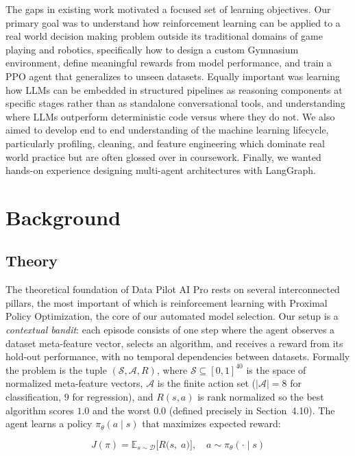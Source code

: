 \documentclass{article}
\begin{document}
The gaps in existing work motivated a focused set of learning objectives. Our primary goal was to understand how reinforcement learning can be applied to a real world decision making problem outside its traditional domains of game playing and robotics, specifically how to design a custom Gymnasium environment, define meaningful rewards from model performance, and train a PPO agent that generalizes to unseen datasets. Equally important was learning how LLMs can be embedded in structured pipelines as reasoning components at specific stages rather than as standalone conversational tools, and understanding where LLMs outperform deterministic code versus where they do not. We also aimed to develop end to end understanding of the machine learning lifecycle, particularly profiling, cleaning, and feature engineering which dominate real world practice but are often glossed over in coursework. Finally, we wanted hands-on experience designing multi-agent architectures with LangGraph.





\section{Background}

\subsection{Theory}

The theoretical foundation of Data Pilot AI Pro rests on several
interconnected pillars, the most important of which is reinforcement
learning with Proximal Policy Optimization, the core of our automated model
selection. Our setup is a \emph{contextual bandit}: each episode consists of
one step where the agent observes a dataset meta-feature vector, selects an
algorithm, and receives a reward from its hold-out performance, with no
temporal dependencies between datasets. Formally the problem is the tuple
$(\mathcal{S}, \mathcal{A}, R)$, where $\mathcal{S} \subseteq [0,1]^{40}$ is
the space of normalized meta-feature vectors, $\mathcal{A}$ is the finite
action set ($|\mathcal{A}| = 8$ for classification, $9$ for regression),
and $R(s, a)$ is rank normalized so the best algorithm scores $1.0$ and the
worst $0.0$ (defined precisely in Section~4.10). The agent learns a policy
$\pi_\theta(a \mid s)$ that maximizes expected reward:

\begin{equation}
    J(\pi) = \mathbb{E}_{s \sim \mathcal{D}}\!\Big[R\!\big(s,\; a\big)\Big],
    \quad a \sim \pi_\theta(\cdot \mid s)
    \label{eq:objective}
\end{equation}
\end{document}
